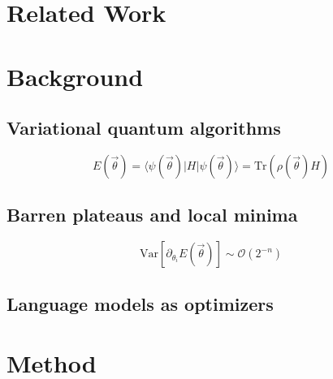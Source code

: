 \documentclass[11pt,a4paper]{article}
\begin{document}
\section{Related Work}

\section{Background}
\subsection{Variational quantum algorithms}
\begin{equation}
E(\vec{\theta}) = \langle \psi(\vec{\theta}) \rvert H \lvert \psi(\vec{\theta}) \rangle = \mathrm{Tr}\left(\rho(\vec{\theta}) H\right)
\end{equation}
\subsection{Barren plateaus and local minima}
\begin{equation}
\mathrm{Var}\left[\partial_{\theta_i} E(\vec{\theta})\right] \sim \mathcal{O}(2^{-n})
\end{equation}
\subsection{Language models as optimizers}

\section{Method}
\end{document}
